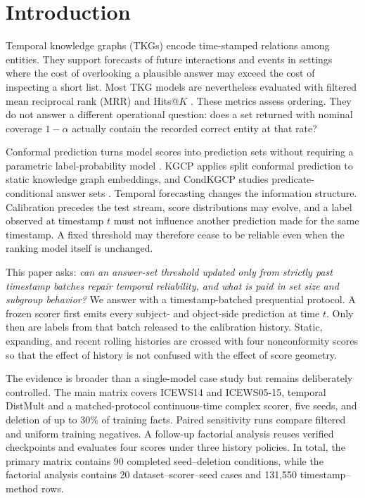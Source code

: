 \documentclass[information,article,submit,oneauthor,pdftex]{Definitions/mdpi}
\begin{document}
\section{Introduction}
\label{sec:introduction}

Temporal knowledge graphs (TKGs) encode time-stamped relations among entities.
They support forecasts of future interactions and events in settings where the
cost of overlooking a plausible answer may exceed the cost of inspecting a
short list. Most TKG models are nevertheless evaluated with filtered mean
reciprocal rank (MRR) and Hits@\(K\)
\cite{garciaduran2018sequence,li2021regcn,li2022tirgn,cai2023survey}. These
metrics assess ordering. They do not answer a different operational question:
does a set returned with nominal coverage \(1-\alpha\) actually contain the
recorded correct entity at that rate?

Conformal prediction turns model scores into prediction sets without requiring
a parametric label-probability model
\cite{vovk2005algorithmic,angelopoulos2023gentle}. KGCP applies split conformal
prediction to static knowledge graph embeddings, and CondKGCP studies
predicate-conditional answer sets \cite{zhu2025kgcp,zhu2025condkgcp}. Temporal
forecasting changes the information structure. Calibration precedes the test
stream, score distributions may evolve, and a label observed at timestamp
\(t\) must not influence another prediction made for the same timestamp. A
fixed threshold may therefore cease to be reliable even when the ranking model
itself is unchanged.

This paper asks: \emph{can an answer-set threshold updated only from strictly
past timestamp batches repair temporal reliability, and what is paid in set
size and subgroup behavior?} We answer with a timestamp-batched prequential
protocol. A frozen scorer first emits every subject- and object-side prediction
at time \(t\). Only then are labels from that batch released to the calibration
history. Static, expanding, and recent rolling histories are crossed with four
nonconformity scores so that the effect of history is not confused with the
effect of score geometry.

The evidence is broader than a single-model case study but remains deliberately
controlled. The main matrix covers ICEWS14 and ICEWS05-15, temporal DistMult
and a matched-protocol continuous-time complex scorer, five seeds, and deletion
of up to 30\% of training facts. Paired sensitivity runs compare filtered and
uniform training negatives. A follow-up factorial analysis reuses verified
checkpoints and evaluates four scores under three history policies. In total,
the primary matrix contains 90 completed seed--deletion conditions, while the
factorial analysis contains 20 dataset--scorer--seed cases and 131,550
timestamp--method rows.
\end{document}
